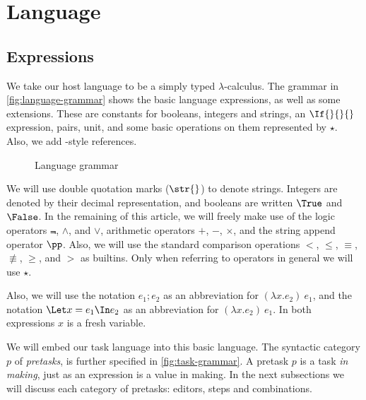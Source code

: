 


\section{Language}


\subsection{Expressions}

We take our host language to be a simply typed $\lambda$-calculus.
The grammar in \autoref{fig:language-grammar} shows the basic language expressions,
as well as some extensions.
These are constants for booleans, integers and strings,
an $\If{}{}{}$ expression,
pairs, unit,
and some basic operations on them represented by $\star$.
Also, we add \ML-style references.

\begin{figure}[h]
  \small
  \caption{Language grammar} \label{fig:language-grammar}
\end{figure}

We will use double quotation marks ($\str{}$) to denote strings.
Integers are denoted by their decimal representation,
and booleans are written $\True$ and $\False$.
In the remaining of this article,
we will freely make use of the logic operators $\Not$, $\land$, and $\lor$,
arithmetic operators $+$, $-$, $\times$,
and the string append operator $\pp$.
Also, we will use the standard comparison operations $<$, $\le$, $\equiv$, $\not\equiv$, $\ge$, and $>$
as builtins.
Only when referring to operators in general we will use $\star$.

Also, we will use the notation $e_1; e_2$
as an abbreviation for $(\lambda x. e_2)\ e_1$,
and the notation $\Let x = e_1 \In e_2$
as an abbreviation for $(\lambda x. e_2)\ e_1$.
In both expressions $x$ is a fresh variable.


We will embed our task language into this basic language.
The syntactic category $p$ of \emph{pretasks},
is further specified in \autoref{fig:task-grammar}.
A pretask $p$ is a task \emph{in making},
just as an expression is a value in making.
In the next subsections we will discuss each category of pretasks:
editors, steps and combinations.


